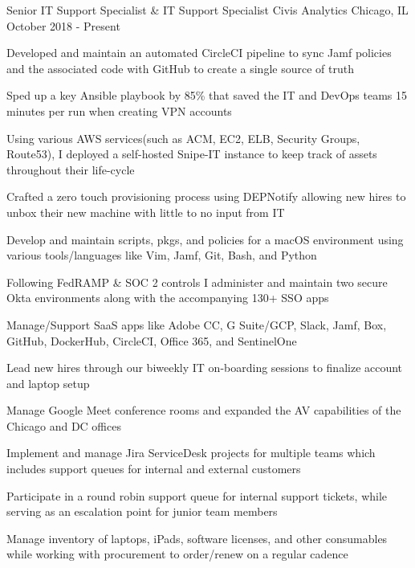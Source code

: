 

\begin{cventries}

	\cventry
	{Senior IT Support Specialist \& IT Support Specialist} %
	{Civis Analytics} %
	{Chicago, IL} %
	{October 2018 - Present} %
	{
		\begin{cvitems} %
			\item {Developed and maintain an automated CircleCI pipeline to sync Jamf policies and the associated code with GitHub to create a single source of truth}
			\item {Sped up a key Ansible playbook by 85\% that saved the IT and DevOps teams 15 minutes per run when creating VPN accounts}
			\item {Using various AWS services(such as ACM, EC2, ELB, Security Groups, Route53), I deployed a self-hosted Snipe-IT instance to keep track of assets throughout their life-cycle}
			\item {Crafted a zero touch provisioning process using DEPNotify allowing new hires to unbox their new machine with little to no input from IT}
			\item {Develop and maintain scripts, pkgs, and policies for a macOS environment using various tools/languages like Vim, Jamf, Git, Bash, and Python}
			\item {Following FedRAMP \& SOC 2 controls I administer and maintain two secure Okta environments along with the accompanying 130+ SSO apps}
			\item {Manage/Support SaaS apps like Adobe CC, G Suite/GCP, Slack, Jamf, Box, GitHub, DockerHub, CircleCI, Office 365, and SentinelOne}
			\item {Lead new hires through our biweekly IT on-boarding sessions to finalize account and laptop setup}
			\item {Manage Google Meet conference rooms and expanded the AV capabilities of the Chicago and DC offices}
			\item {Implement and manage Jira ServiceDesk projects for multiple teams which includes support queues for internal and external customers}
			\item {Participate in a round robin support queue for internal support tickets, while serving as an escalation point for junior team members}
			\item {Manage inventory of laptops, iPads, software licenses, and other consumables while working with procurement to order/renew on a regular cadence}
		\end{cvitems}
	}


\end{cventries}
